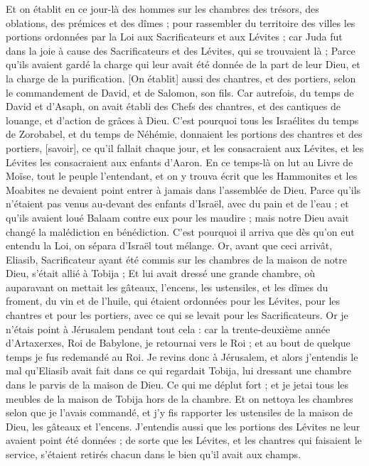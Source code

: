 \begin{multicols}{2}
Et on établit en ce jour-là des hommes sur les chambres des trésors, des oblations, des prémices et des dîmes ; pour rassembler du territoire des villes les portions ordonnées par la Loi aux Sacrificateurs et aux Lévites ; car Juda fut dans la joie à cause des Sacrificateurs et des Lévites, qui se trouvaient là ;
Parce qu'ils avaient gardé la charge qui leur avait été donnée de la part de leur Dieu, et la charge de la purification. [On établit] aussi des chantres, et des portiers, selon le commandement de David, et de Salomon, son fils.
Car autrefois, du temps de David et d'Asaph, on avait établi des Chefs des chantres, et des cantiques de louange, et d'action de grâces à Dieu.
C'est pourquoi tous les Israélites du temps de Zorobabel, et du temps de Néhémie, donnaient les portions des chantres et des portiers, [savoir], ce qu'il fallait chaque jour, et les consacraient aux Lévites, et les Lévites les consacraient aux enfants d'Aaron.
\VerseOne{}En ce temps-là on lut au Livre de Moïse, tout le peuple l'entendant, et on y trouva écrit que les Hammonites et les Moabites ne devaient point entrer à jamais dans l'assemblée de Dieu.
Parce qu'ils n'étaient pas venus au-devant des enfants d'Israël, avec du pain et de l'eau ; et qu'ils avaient loué Balaam contre eux pour les maudire ; mais notre Dieu avait changé la malédiction en bénédiction.
C'est pourquoi il arriva que dès qu'on eut entendu la Loi, on sépara d'Israël tout mélange.
Or, avant que ceci arrivât, Eliasib, Sacrificateur ayant été commis sur les chambres de la maison de notre Dieu, s'était allié à Tobija ;
Et lui avait dressé une grande chambre, où auparavant on mettait les gâteaux, l'encens, les ustensiles, et les dîmes du froment, du vin et de l'huile, qui étaient ordonnées pour les Lévites, pour les chantres et pour les portiers, avec ce qui se levait pour les Sacrificateurs.
Or je n'étais point à Jérusalem pendant tout cela : car la trente-deuxième année d'Artaxerxes, Roi de Babylone, je retournai vers le Roi ; et au bout de quelque temps je fus redemandé au Roi.
Je revins donc à Jérusalem, et alors j'entendis le mal qu'Eliasib avait fait dans ce qui regardait Tobija, lui dressant une chambre dans le parvis de la maison de Dieu.
Ce qui me déplut fort ; et je jetai tous les meubles de la maison de Tobija hors de la chambre.
Et on nettoya les chambres selon que je l'avais commandé, et j'y fis rapporter les ustensiles de la maison de Dieu, les gâteaux et l'encens.
J'entendis aussi que les portions des Lévites ne leur avaient point été données ; de sorte que les Lévites, et les chantres qui faisaient le service, s'étaient retirés chacun dans le bien qu'il avait aux champs.

\end{multicols}
